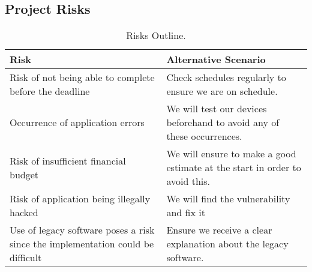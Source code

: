 \documentclass[a4paper,11pt]{article}
\begin{document}
    \subsection{Project Risks}
    \begin{table}[h!]
    \centering
    \caption{Risks Outline.}
    \label{tab:table1}
    \begin{tabularx}{\textwidth}{ |X|X| }
    \hline
    \textbf{Risk} & \textbf{
    Alternative Scenario
	}
    \\
    \hline
    Risk of not being able to complete before the deadline	 &
    Check schedules regularly to ensure we are on schedule.
    \\
    \hline
    Occurrence of application errors & 
    We will test our devices beforehand to avoid any of these occurrences.
    \\
    \hline
    Risk of insufficient financial budget &
    We will ensure to make a good estimate at the start in order to avoid this.
    \\ \hline
    Risk of application being illegally hacked & 
    We will find the vulnerability and fix it
    \\
    \hline
    Use of legacy software poses a risk since the implementation could be difficult & 
    Ensure we receive a clear explanation about the legacy software.  
    \\ \hline
    
    \end{tabularx}
    \end{table}
    
    
    
\end{document}
